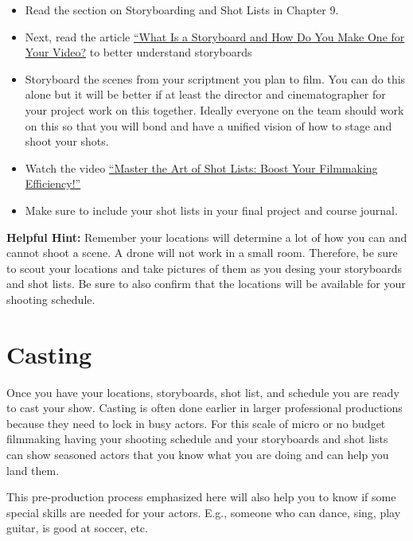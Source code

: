 \documentclass[
]{book}
\providecommand{\tightlist}{%
  \setlength{\itemsep}{0pt}\setlength{\parskip}{0pt}}
\begin{document}
\begin{reflect}
\begin{itemize}
\tightlist
\item
  Read the section on Storyboarding and Shot Lists in Chapter 9.
\item
  Next, read the article \href{https://www.wyzowl.com/what-is-a-storyboard/}{``What Is a Storyboard and How Do You Make One for Your Video?} to better understand storyboards
\item
  Storyboard the scenes from your scriptment you plan to film. You can do this alone but it will be better if at least the director and cinematographer for your project work on this together. Ideally everyone on the team should work on this so that you will bond and have a unified vision of how to stage and shoot your shots.
\item
  Watch the video \href{https://www.youtube.com/watch?v=-rzJP_5L_yQ}{``Master the Art of Shot Lists: Boost Your Filmmaking Efficiency!''}
\end{itemize}

\begin{itemize}
\tightlist
\item
  Make sure to include your shot lists in your final project and course journal.
\end{itemize}

\textbf{Helpful Hint:} Remember your locations will determine a lot of how you can and cannot shoot a scene. A drone will not work in a small room. Therefore, be sure to scout your locations and take pictures of them as you desing your storyboards and shot lists. Be sure to also confirm that the locations will be available for your shooting schedule.
\end{reflect}

\hypertarget{casting}{%
\section{Casting}\label{casting}}

Once you have your locations, storyboards, shot list, and schedule you are ready to cast your show. Casting is often done earlier in larger professional productions because they need to lock in busy actors. For this scale of micro or no budget filmmaking having your shooting schedule and your storyboards and shot lists can show seasoned actors that you know what you are doing and can help you land them.

This pre-production process emphasized here will also help you to know if some special skills are needed for your actors. E.g., someone who can dance, sing, play guitar, is good at soccer, etc.
\end{document}
